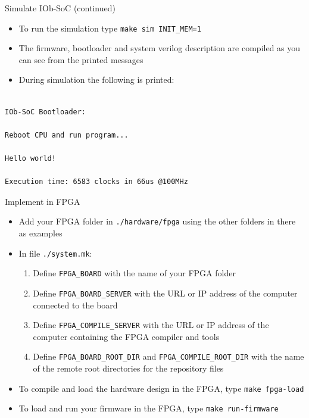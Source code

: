 \documentclass [xcolor=svgnames, t] {beamer}
\begin{document}
\begin{frame}[fragile]{Simulate IOb-SoC (continued)}
\begin{itemize}
  \item To run the simulation type {\tt make sim INIT\_MEM=1}
  \item The firmware, bootloader and system verilog description are compiled as you can see from the printed messages
  \item During simulation the following is printed:
\end{itemize}
\begin{tiny}
\begin{lstlisting}

IOb-SoC Bootloader:

Reboot CPU and run program...

Hello world!

Execution time: 6583 clocks in 66us @100MHz

\end{lstlisting}
\end{tiny}
\end{frame}


\begin{frame}{Implement in FPGA}
\begin{itemize}
  \item Add your FPGA folder in {\tt ./hardware/fpga} using the other folders in there as examples
  \item In file {\tt ./system.mk}:
  \begin{enumerate}
    \item Define {\tt FPGA\_BOARD} with the name of your FPGA folder
    \item Define {\tt FPGA\_BOARD\_SERVER} with the URL or IP address of the computer connected to the board
    \item Define {\tt FPGA\_COMPILE\_SERVER} with the URL or IP address of the computer containing the FPGA compiler and tools
    \item Define {\tt FPGA\_BOARD\_ROOT\_DIR} and {\tt FPGA\_COMPILE\_ROOT\_DIR} with the name of the remote root directories for the repository files
  \end{enumerate}
  \item To compile and load the hardware design in the FPGA, type {\tt make fpga-load}
  \item To load and run your firmware in the FPGA, type {\tt make run-firmware}
\end{itemize}
\end{frame}
\end{document}
